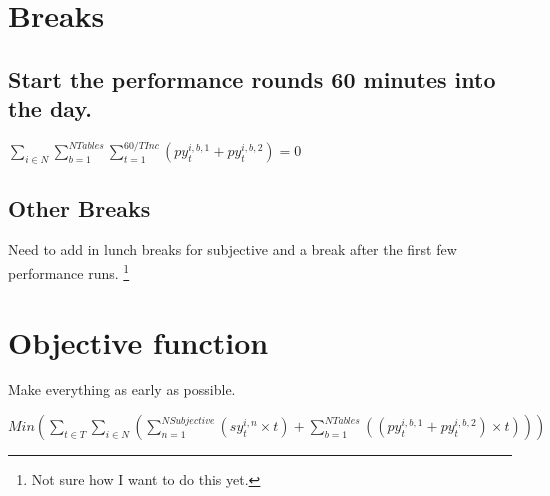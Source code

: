 \documentclass[letterpaper,11pt]{report}
\newcommand{\doccomment}[3]%
{\marginpar{\textcolor{#2}{\bf #1}}%
\footnote{{\color{#2}#3}}%
}
\newcommand{\doccomment}[3]{}
\newcommand{\jpscomment}[1]%
{\doccomment{SCHEWE}{Bittersweet}{#1}}
\begin{document}
\section{Breaks}
\subsection{Start the performance rounds 60 minutes into the day.}
$\sum\limits_{i \in N} \sum\limits_{b=1}^{NTables} 
    \sum\limits_{t = 1}^{60/TInc} 
      ( py_{t}^{i,b,1} + py_{t}^{i,b,2} ) = 0$

\subsection{Other Breaks}
Need to add in lunch breaks for subjective and a break after the first few
performance runs. \jpscomment{Not sure how I want to do this yet.}

\section{Objective function}
Make everything as early as possible.

$Min ( 
\sum\limits_{t \in T}
  \sum\limits_{i \in N} (
    \sum\limits_{n=1}^{NSubjective}
      ( sy_{t}^{i,n} \times t )
  + \sum\limits_{b=1}^{NTables} ( ( py_{t}^{i,b,1} + py_{t}^{i,b,2} )
  \times t)
  )
) $
\end{document}

